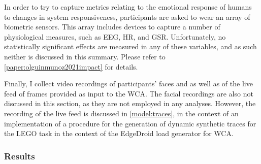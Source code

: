 In order to try to capture metrics relating to the emotional response of humans to changes in system responsiveness, participants are asked to wear an array of biometric sensors.
This array includes devices to capture a number of physiological measures, such as \gls{EEG}, \gls{HR}, and \gls{GSR}.
Unfortunately, no statistically significant effects are measured in any of these variables, and as such neither is discussed in this summary.
Please refer to \cref{paper:olguinmunoz2021impact} for details.

Finally, I collect video recordings of participants' faces and as well as of the live feed of frames provided as input to the \gls{WCA}.
The facial recordings are also not discussed in this section, as they are not employed in any analyses.
However, the recording of the live feed is discussed in \cref{model:traces}, in the context of an implementation of a procedure for the generation of dynamic synthetic traces for the LEGO task in the context of the EdgeDroid load generator for \gls{WCA}.

\subsubsection{Results}\label{impact:results}

